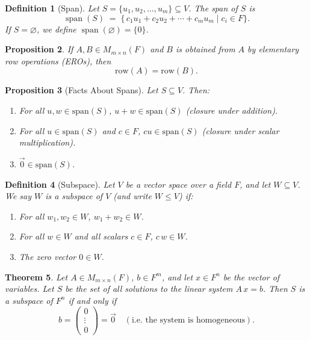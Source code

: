 \documentclass[12pt]{article}
\theoremstyle{break}             %
\newtheorem{thm}{Theorem}          %
\newtheorem{prop}[thm]{Proposition}%
\newtheorem{defn}[thm]{Definition}
\begin{document}
\begin{defn}[Span]
Let \(S=\{u_1,u_2,\dots,u_m\}\subseteq V\).  The \emph{span} of \(S\) is
\[
  \operatorname{span}(S)
  \;=\;
  \bigl\{\,c_1u_1 + c_2u_2 + \cdots + c_mu_m
  \;\big|\;
  c_i\in F\bigr\}.
\]
If \(S=\varnothing\), we define \(\operatorname{span}(\varnothing)=\{0\}\).
\end{defn}

\begin{prop}
If \(A,B \in M_{m \times n}(F)\) and \(B\) is obtained from \(A\) by elementary row operations (EROs), then
\[
\mathrm{row}(A) = \mathrm{row}(B).
\]
\end{prop}

\begin{prop}[Facts About Spans]
Let \(S \subseteq V\). Then:
\begin{enumerate}
\item For all \(u,w \in \mathrm{span}(S)\), \(u + w \in \mathrm{span}(S)\) 
  \quad(\emph{closure under addition}).
\item For all \(u \in \mathrm{span}(S)\) and \(c \in F\), \(cu \in \mathrm{span}(S)\) 
  \quad(\emph{closure under scalar multiplication}).
\item \(\vec{0} \in \mathrm{span}(S)\).
\end{enumerate}
\end{prop}

\begin{defn}[Subspace]
Let \(V\) be a vector space over a field \(F\), and let \(W\subseteq V\).  We say \(W\) is a \emph{subspace} of \(V\) (and write \(W \leq V\)) if:
\begin{enumerate}
  \item For all \(w_1,w_2\in W\), \(w_1+w_2\in W\).
  \item For all \(w\in W\) and all scalars \(c\in F\), \(c\,w\in W\).
  \item The zero vector \(0\in W\).
\end{enumerate}
\end{defn}

\begin{thm}
Let \(A \in M_{m \times n}(F)\), \(b \in F^m\), and let \(x \in F^n\) be the vector of variables.  
Let \(S\) be the set of all solutions to the linear system \(A\,x = b\).  
Then \(S\) is a subspace of \(F^n\) if and only if 
\[
b = 
\begin{pmatrix}
0 \\ \vdots \\ 0
\end{pmatrix} 
= \vec{0}
\quad (\text{i.e.\ the system is homogeneous}).
\]
\end{thm}
\end{document}
